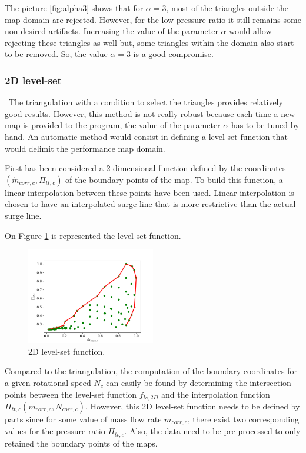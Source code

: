 The picture \ref{fig:alpha3} shows that for $\alpha=3$, most of the triangles outside the map domain are rejected. However, for the low pressure ratio it still remains some non-desired artifacts. Increasing the value of the parameter $\alpha$ would allow rejecting these
triangles as well but, some triangles within the domain also start to be removed. So, the value $\alpha=3$ is a good compromise.

\subsubsection{2D level-set}
\quad\ The triangulation with a condition to select the triangles provides relatively good results. However, this method is not really robust because each time a new map is provided to the program, the value of the parameter $\alpha$ has to be tuned by hand. An automatic method would consist in defining a level-set function that would delimit the performance map domain.

First has been considered a 2 dimensional function defined by the coordinates $(\dot{m}_{corr,c},\Pi_{tt,c})$ of the boundary points of the map. To build this function, a linear interpolation between these points have been used. Linear interpolation is chosen to have an interpolated surge line that is more restrictive than the actual surge line.

On Figure \ref{fig:C7_LS2D} is represented the level set function.

\begin{figure}[h]
    \centering
    \includegraphics[width=0.5\textwidth]{Comp_map/2D_LS.png}
    \caption{2D level-set function.}
    \label{fig:C7_LS2D}
\end{figure}

Compared to the triangulation, the computation of the boundary coordinates for a given rotational speed $N_c$ can easily be found by determining the intersection points between the level-set function $f_{ls,2D}$ and the interpolation function $\Pi_{tt,c}(\dot{m}_{corr,c},N_{corr,c})$. 
However, this 2D level-set function needs to be defined by parts since for some value of mass flow rate $\dot{m}_{corr,c}$, there exist two corresponding values for the pressure ratio $\Pi_{tt,c}$. Also, the data need to be pre-processed to only retained the boundary points of the maps. 

